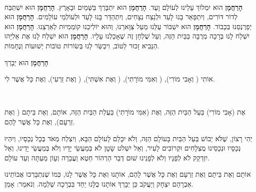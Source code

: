 \ \\

{\bf הָרַחֲמָן}
הוּא יִמְלוֹךְ עָלֵינוּ לְעוֹלָם וָעֶד.
{\bf הָרַחֲמָן}
הוּא יִתְבָּרַךְ בַּשָּׁמַיִם וּבָאָרֶץ.
{\bf הָרַחֲמָן}
הוּא יִשְׁתַּבַּח לְדוֹר דּוֹרִים, וְיִתְפָּאַר בָּנוּ לָעַד וּלְנֵצַח נְצָחִים, וְיִתְהַדַּר בָּנוּ לָעַד וּלְעוֹלְמֵי עוֹלָמִים.
{\bf הָרַחֲמָן}
הוּא יְפַרְנְסֵנוּ בְּכָבוֹד.
{\bf הָרַחֲמָן}
הוּא יִשְׁבּוֹר עֻלֵּנוּ מֵעַל צַּוָּארֵנוּ, וְהוּא יוֹלִיכֵנוּ קוֹמְמִיוּת לְאַרְצֵנוּ.
{\bf הָרַחֲמָן}
הוּא יִשְׁלַח לָנוּ בְּרָכָה מְרֻבָּה בַּבַּיִת הַזֶּה, וְעַל שֻׁלְחָן זֶה שֶׁאָכַלְנוּ עָלָיו.
{\bf הָרַחֲמָן}
הוּא יִשְׁלַח לָנוּ אֶת אֵלִיָּהוּ הַנָּבִיא זָכוּר לַטּוֹב, וִיבַשֵּׂר לָנוּ בְּשׂוֹרוֹת טוֹבוֹת יְשׁוּעוֹת וְנֶחָמוֹת.


\break

\begin{center}
{\bf הָרַחֲמָן}
הוּא יְבָרֵךְ 


אוֹתִי ( וְאָבִי מוֹרִי), ( וְאִמִּי מוֹרָתִי), ( וְאֶת אִשְׁתִּי), ( וְאֶת זַרְעִי), וְאֶת כָּל אֲשֶׁר לִי.

\ \\


אֶת (אָבִי מוֹרִי) בַּעַל הַבַּיִת הַזֶּה, וְאֶת (אִמִּי מוֹרָתִי) בַּעֲלַת הַבַּיִת הַזֶּה, אוֹתָם, וְאֶת בֵּיתָם ( וְאֶת זַרְעָם), וְאֶת כָּל אֲשֶׁר לָהֶם.
\end{center}

\begin{framed}

יְהִי רָצוֹן, שֶׁלֹּא יֵבוֹשׁ בַּעַל הַבַּיִת בָּעוֹלָם הַזֶּה, וְלֹא יִכָּלֵם לָעוֹלָם הַבָּא, וְיִצְלַח מְאֹד בְּכָל נְכָסָיו, וְיִהְיוּ נְכָסָיו וּנְכָסֵינוּ מֻצְלָחִים וּקְרוֹבִים לָעִיר, וְאַל יִשְׁלֹט שָׂטָן לֹא בְּמַעֲשֵׂי יָדָיו וְלֹא בְּמַעֲשֵׂי יָדֵינוּ, וְאַל יִזְדַקֵק לֹא לְפָנָיו וְלֹא לְפָנֵינוּ שׁוּם דְבַר הַרְהוֹר חֵטְא וַעֲבֵרָה וְעָוֹן מֵעַתָּה וְעַד עוֹלָם.
\end{framed}

אוֹתָם וְאֶת בֵּיתָם וְאֶת זַרְעָם וְאֶת כָּל אֲשֶׁר לָהֶם, אוֹתָנוּ וְאֶת כָּל אֲשֶׁר לָנוּ, כְּמוֹ שֶׁנִּתְבָּרְכוּ אֲבוֹתֵינוּ אַבְרָהָם יִצְחָק וְיַעֲקֹב
כֵּן יְבָרֵךְ אוֹתָנוּ כֻּלָּנוּ יַחַד בִּבְרָכָה שְׁלֵמָה. וְנֹאמַר: אָמֵן.

